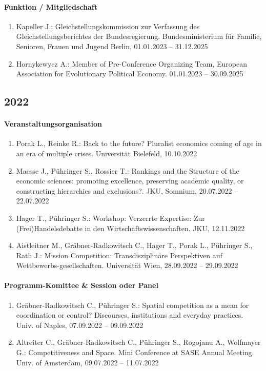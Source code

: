 \paragraph{Funktion / Mitgliedschaft}
\begin{enumerate}[leftmargin=*, labelsep=0.5cm]
\item Kapeller J.: Gleichstellungskommission zur Verfassung des Gleichstellungsberichtes der Bundesregierung. Bundesministerium für Familie, Senioren, Frauen und Jugend Berlin, 01.01.2023 -- 31.12.2025
\item Hornykewycz A.: Member of Pre-Conference Organizing Team, European Association for Evolutionary Political Economy. 01.01.2023 -- 30.09.2025
\end{enumerate}
\subsection*{2022}
\paragraph{Veranstaltungsorganisation}
\begin{enumerate}[leftmargin=*, labelsep=0.5cm]
\item Porak L., Reinke R.: Back to the future? Pluralist economics coming of age in an era of multiple crises. Universität Bielefeld, 10.10.2022
\item Maesse J., Pühringer S., Rossier T.: Rankings and the Structure of the economic sciences: promoting excellence, preserving academic quality, or constructing hierarchies and exclusions?. JKU, Somnium, 20.07.2022 -- 22.07.2022
\item Hager T., Pühringer S.: Workshop: Verzerrte Expertise: Zur (Frei)Handelsdebatte in den Wirtschaftswissenschaften. JKU, 12.11.2022
\item Aistleitner M., Gräbner-Radkowitsch C., Hager T., Porak L., Pühringer S., Rath J.: Mission Competition: Transdisziplinäre Perspektiven auf Wettbewerbs-gesellschaften. Universität Wien, 28.09.2022 -- 29.09.2022
\end{enumerate}

\paragraph{Programm-Komittee \& Session oder Panel}
\begin{enumerate}[leftmargin=*, labelsep=0.5cm]
\item Gräbner-Radkowitsch C., Pühringer S.: Spatial competition as a mean for coordination or control? Discourses, institutions and everyday practices. Univ. of Naples, 07.09.2022 -- 09.09.2022
\item Altreiter C., Gräbner-Radkowitsch C., Pühringer S., Rogojanu A., Wolfmayer G.: Competitiveness and Space. Mini Conference at SASE Annual Meeting. Univ. of Amsterdam, 09.07.2022 -- 11.07.2022
\end{enumerate}

